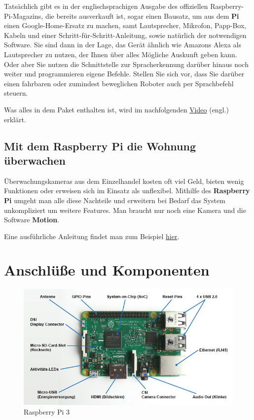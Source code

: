 \documentclass[12pt,a4paper]{article}
\newcommand{\rp}{\textbf{Raspberry Pi}\xspace}
\begin{document}
Tatsächlich gibt es in der englischsprachigen Ausgabe des offiziellen Raspberry-Pi-Magazins, die bereits ausverkauft ist, sogar einen Bausatz, um aus dem \textbf{Pi} einen Google-Home-Ersatz zu machen, samt Lautsprecher, Mikrofon, Papp-Box, Kabeln und einer Schritt-für-Schritt-Anleitung, sowie natürlich der notwendigen Software. Sie sind dann in der Lage, das Gerät ähnlich wie Amazons Alexa als Lautsprecher zu nutzen, der Ihnen über alles Mögliche Auskunft geben kann. Oder aber Sie nutzen die Schnittstelle zur Spracherkennung darüber hinaus noch weiter und programmieren eigene Befehle. Stellen Sie sich vor, dass Sie darüber einen fahrbaren oder zumindest beweglichen Roboter auch per Sprachbefehl steuern.

Was alles in dem Paket enthalten ist, wird im nachfolgenden \href{https://www.youtube.com/watch?v=7WtSdWSv7uo}{Video} (engl.) erklärt.

\subsection{Mit dem \rp die Wohnung überwachen}

Überwachungskameras aus dem Einzelhandel kosten oft viel Geld, bieten wenig Funktionen oder erweisen sich im Einsatz als unflexibel. Mithilfe des \rp umgeht man alle diese Nachteile und erweitern bei Bedarf das System unkompliziert um weitere Features. Man braucht nur noch eine Kamera und die Software \textbf{Motion}.

Eine ausführliche Anleitung findet man zum Beispiel \href{ttps://www.pcwelt.de/1925151/}{hier}.

\clearpage
\appendix
\makeatletter
\def\@seccntformat#1{Anhang~\csname the#1\endcsname:\quad}
\makeatother

\section{Anschlüße und Komponenten}
\label{apx:comp}

\begin{figure}[h]
\centering
\includegraphics[scale=0.7]{raspberry_loesung}
\caption{Raspberry Pi 3}
\label{fig:rp_ls}
\end{figure}
\end{document}
